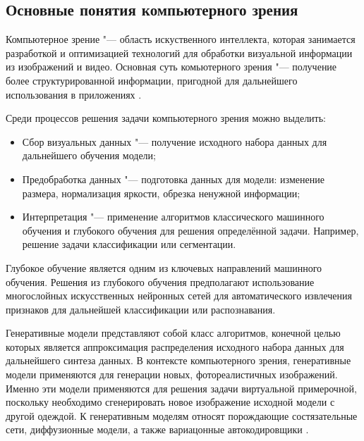 \subsection{Основные понятия компьютерного зрения}
Компьютерное зрение "--- область искуственного интеллекта, которая занимается разработкой и оптимизацией технологий для обработки визуальной информации из изображений и видео. Основная суть комьютерного зрения "--- получение более структурированной информации, пригодной для дальнейшего использования в приложениях \cite{cv_intro}.

Среди процессов решения задачи компьютерного зрения можно выделить:
\begin{itemize}
    \item Сбор визуальных данных "--- получение исходного набора данных для дальнейшего обучения модели;
    \item Предобработка данных "--- подготовка данных для модели: изменение размера, нормализация яркости, обрезка ненужной информации;
    \item Интерпретация "--- применение алгоритмов классического машинного обучения и глубокого обучения для решения определённой задачи. Например, решение задачи классификации или сегментации. 
\end{itemize}

Глубокое обучение является одним из ключевых направлений машинного обучения. Решения из глубокого обучения предполагают использование многослойных искусственных нейронных сетей для автоматического извлечения признаков для дальнейшей классификации или распознавания. 

Генеративные модели представляют собой класс алгоритмов, конечной целью которых является аппроксимация распределения исходного набора данных для дальнейшего синтеза данных. В контексте компьютерного зрения, генеративные модели применяются для генерации новых, фотореалистичных изображений. Именно эти модели применяются для решения задачи виртуальной примерочной, поскольку необходимо сгенерировать новое изображение исходной модели с другой одеждой. К генеративным моделям относят порождающие состязательные сети, диффузионные модели, а также вариацонные автокодировщики \cite{generative_plus_gan}.